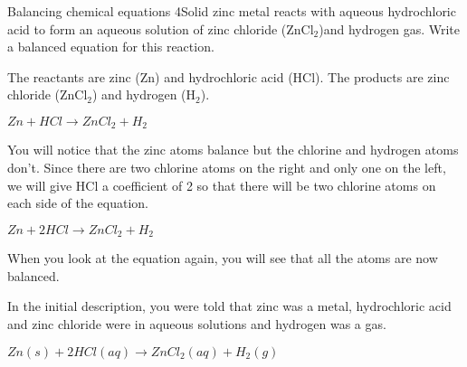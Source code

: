 \begin{wex}{Balancing chemical equations 4}{Solid zinc metal reacts with aqueous hydrochloric acid to form an aqueous solution of zinc chloride (ZnCl$_{2}$)and hydrogen gas. Write a balanced equation for this reaction.\\}

{
The reactants are zinc (Zn) and hydrochloric acid (HCl). The products are zinc chloride (ZnCl$_{2}$) and hydrogen (H$_{2}$).\\
}

{
\begin{center}
\rm${Zn + HCl \rightarrow ZnCl_{2} + H_{2}}$\\
\end{center}
}

{
You will notice that the zinc atoms balance but the chlorine and hydrogen atoms don't. Since there are two chlorine atoms on the right and only one on the left, we will give HCl a coefficient of 2 so that there will be two chlorine atoms on each side of the equation.

\begin{center}
\rm${Zn + 2HCl \rightarrow ZnCl_{2} + H_{2}}$\\
\end{center}
}

{
When you look at the equation again, you will see that all the atoms are now balanced.\\
}

{
In the initial description, you were told that zinc was a metal, hydrochloric acid and zinc chloride were in aqueous solutions and hydrogen was a gas.

\begin{center}
\rm${Zn(s) + 2HCl(aq) \rightarrow ZnCl_{2}(aq) + H_{2}(g)}$
\end{center}
}
\end{wex}

